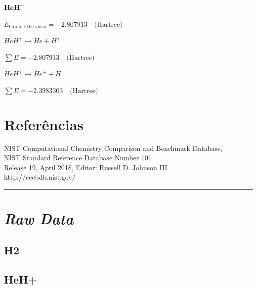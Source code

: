 \documentclass[portuguese,]{article}
\begin{document}
\begin{minipage}{\textwidth}

$\textbf{HeH}^+$

\quad $E_\text{Grande Distância} = -2.807913 \quad \text{(Hartree)}$

\qquad $HeH^{+} \longrightarrow He + H^+$

\qquad \quad $\sum E = -2.807913 \quad \text{(Hartree)}$

\qquad $HeH^{+} \longrightarrow He^+ + H$

\qquad \quad $\sum E = -2.3983303 \quad \text{(Hartree)}$

\end{minipage}

\hypertarget{referuxeancias}{%
\section{Referências}\label{referuxeancias}}

NIST Computational Chemistry Comparison and Benchmark Database,\\
NIST Standard Reference Database Number 101\\
Release 19, April 2018, Editor: Russell D. Johnson III\\
http://cccbdb.nist.gov/

\begin{center}\rule{0.5\linewidth}{\linethickness}\end{center}

\twocolumn
\appendix

\hypertarget{raw-data}{%
\section{\texorpdfstring{\emph{Raw Data}}{Raw Data}}\label{raw-data}}

\hypertarget{h2}{%
\subsection{H2}\label{h2}}

\label{data:varH}

\begingroup

\endgroup

\hypertarget{heh}{%
\subsection{HeH+}\label{heh}}

\label{data:varHeH}
\end{document}
